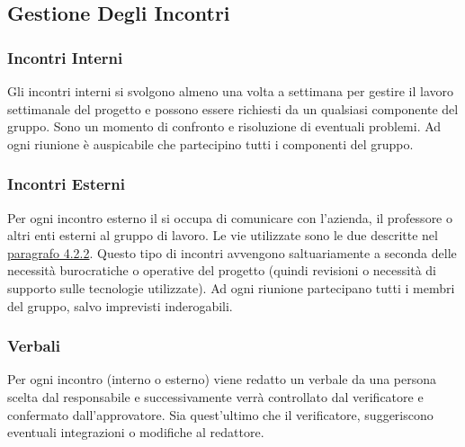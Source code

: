 		\subsection{Gestione Degli Incontri}
		\subsubsection{Incontri Interni}
		Gli incontri interni si svolgono almeno una volta a settimana per gestire il lavoro settimanale del progetto e possono essere richiesti da un qualsiasi componente del gruppo. Sono un momento di confronto e risoluzione di eventuali problemi. Ad ogni riunione è auspicabile che partecipino tutti i componenti del gruppo.
		\subsubsection{Incontri Esterni}
		Per ogni incontro esterno il \RdP{} si occupa di comunicare con l'azienda, il professore o altri enti esterni al gruppo di lavoro. 
		Le vie utilizzate sono le due descritte nel \hyperref[sec:Comunicazioni Esterne]{paragrafo 4.2.2}.
		Questo tipo di incontri avvengono saltuariamente a seconda delle necessità burocratiche o operative del progetto (quindi revisioni o necessità di supporto sulle tecnologie utilizzate).
		Ad ogni riunione partecipano tutti i membri del gruppo, salvo imprevisti inderogabili.
		\subsubsection{Verbali}
		Per ogni incontro (interno o esterno) viene redatto un verbale da una persona scelta dal responsabile e successivamente verrà controllato dal verificatore e confermato dall’approvatore. Sia quest'ultimo che il verificatore, suggeriscono eventuali integrazioni o modifiche al redattore.

